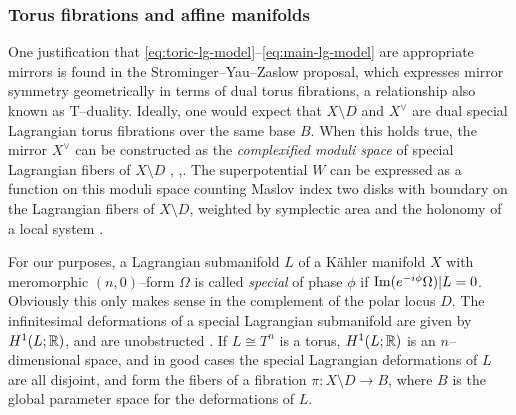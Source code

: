 \documentclass[12pt]{amsart}
\begin{document}
\subsubsection{Torus fibrations and affine manifolds}
\label{sec:intro-SYZ}

One justification that
\eqref{eq:toric-lg-model}--\eqref{eq:main-lg-model} are appropriate
mirrors is found in the Strominger--Yau--Zaslow proposal, which
expresses mirror symmetry geometrically in terms of dual torus
fibrations, a relationship also known as T--duality. Ideally, one
would expect that $X \setminus D$ and $X^\vee$ are dual special
Lagrangian torus fibrations over the same base $B$. When this holds
true, the mirror $X^\vee$ can be constructed as the \emph{complexified
  moduli space} of special Lagrangian fibers of $X\setminus D$
\cite{mclean-calibrated}, \cite{hitchin-slag},\cite[\S
2]{auroux07}. The superpotential $W$ can be expressed as a function
on this moduli space counting Maslov index two disks with boundary on
the Lagrangian fibers of $X\setminus D$, weighted by symplectic area
and the holonomy of a local system \cite{auroux07}.


For our purposes, a Lagrangian submanifold $L$ of a K\"{a}hler manifold
$X$ with meromorphic $(n,0)$--form $\Omega$ is called \emph{special}
of phase $\phi$ if $\operatorname{Im}(e^{-i\phi}\Omega)|L = 0$. Obviously this only
makes sense in the complement of the polar locus $D$. The
infinitesimal deformations of a special Lagrangian submanifold are
given by $H^1(L;\mathbb{R})$, and are unobstructed \cite{mclean-calibrated}. If $L \cong T^n$ is a
torus, $H^1(L;\mathbb{R})$ is an $n$--dimensional space, and in good cases the
special Lagrangian deformations of $L$ are all disjoint, and form the
fibers of a fibration $\pi: X\setminus D\to B$, where $B$ is the global parameter
space for the deformations of $L$.
\end{document}
